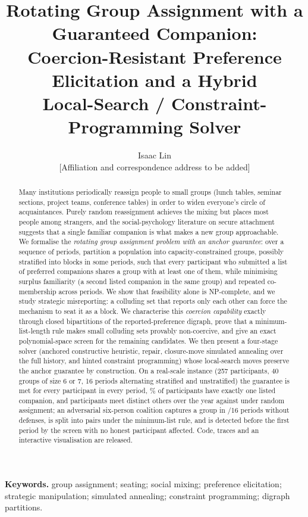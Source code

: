 \documentclass[11pt,a4paper]{article}
\title{Rotating Group Assignment with a Guaranteed Companion:\\
Coercion-Resistant Preference Elicitation and a Hybrid\\ Local-Search / Constraint-Programming Solver}
\author{Isaac Lin\\[2pt] \small [Affiliation and correspondence address to be added]}
\date{}
\theoremstyle{plain}
\theoremstyle{definition}
\theoremstyle{remark}
\begin{document}
\maketitle

\begin{abstract}
Many institutions periodically reassign people to small groups (lunch tables, seminar sections, project teams, conference tables) in order to widen everyone's circle of acquaintances. Purely random reassignment achieves the mixing but places most people among strangers, and the social-psychology literature on secure attachment suggests that a single familiar companion is what makes a new group approachable. We formalise the \emph{rotating group assignment problem with an anchor guarantee}: over a sequence of periods, partition a population into capacity-constrained groups, possibly stratified into blocks in some periods, such that every participant who submitted a list of preferred companions shares a group with at least one of them, while minimising surplus familiarity (a second listed companion in the same group) and repeated co-membership across periods. We show that feasibility alone is NP-complete, and we study strategic misreporting: a colluding set that reports only each other can force the mechanism to seat it as a block. We characterise this \emph{coercion capability} exactly through closed bipartitions of the reported-preference digraph, prove that a minimum-list-length rule makes small colluding sets provably non-coercive, and give an exact polynomial-space screen for the remaining candidates. We then present a four-stage solver (anchored constructive heuristic, repair, closure-move simulated annealing over the full history, and hinted constraint programming) whose local-search moves preserve the anchor guarantee by construction. On a real-scale instance (257 participants, 40 groups of size 6 or 7, 16 periods alternating stratified and unstratified) the guarantee is met for every participant in every period, \HonestExactlyOne\% of participants have exactly one listed companion, and participants meet \HonestMet{} distinct others over the year against \RandomMet{} under random assignment; an adversarial six-person coalition captures a group in \NoneIntact/16 periods without defenses, is split into pairs under the minimum-list rule, and is detected before the first period by the screen with no honest participant affected. Code, traces and an interactive visualisation are released.
\end{abstract}

\noindent\textbf{Keywords.} group assignment; seating; social mixing; preference elicitation; strategic manipulation; simulated annealing; constraint programming; digraph partitions.
\end{document}
